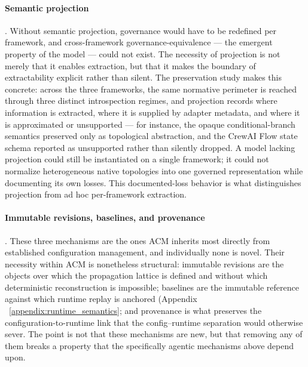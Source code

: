 \documentclass[10pt]{article}
\begin{document}
\paragraph{Semantic projection}. Without semantic projection, governance would have to be redefined per framework, and cross-framework governance-equivalence — the emergent property of the model — could not exist. The necessity of projection is not merely that it enables extraction, but that it makes the boundary of extractability explicit rather than silent. The preservation study makes this concrete: across the three frameworks, the same normative perimeter is reached through three distinct introspection regimes, and projection records where information is extracted, where it is supplied by adapter metadata, and where it is approximated or unsupported — for instance, the opaque conditional-branch semantics preserved only as topological abstraction, and the CrewAI Flow state schema reported as unsupported rather than silently dropped. A model lacking projection could still be instantiated on a single framework; it could not normalize heterogeneous native topologies into one governed representation while documenting its own losses. This documented-loss behavior is what distinguishes projection from ad hoc per-framework extraction.

\paragraph{Immutable revisions, baselines, and provenance}. These three mechanisms are the ones ACM inherits most directly from established configuration management, and individually none is novel. Their necessity within ACM is nonetheless structural: immutable revisions are the objects over which the propagation lattice is defined and without which deterministic reconstruction is impossible; baselines are the immutable reference against which runtime replay is anchored (Appendix ~\ref{appendix:runtime_semantics}; and provenance is what preserves the configuration-to-runtime link that the config–runtime separation would otherwise sever. The point is not that these mechanisms are new, but that removing any of them breaks a property that the specifically agentic mechanisms above depend upon.
\end{document}
